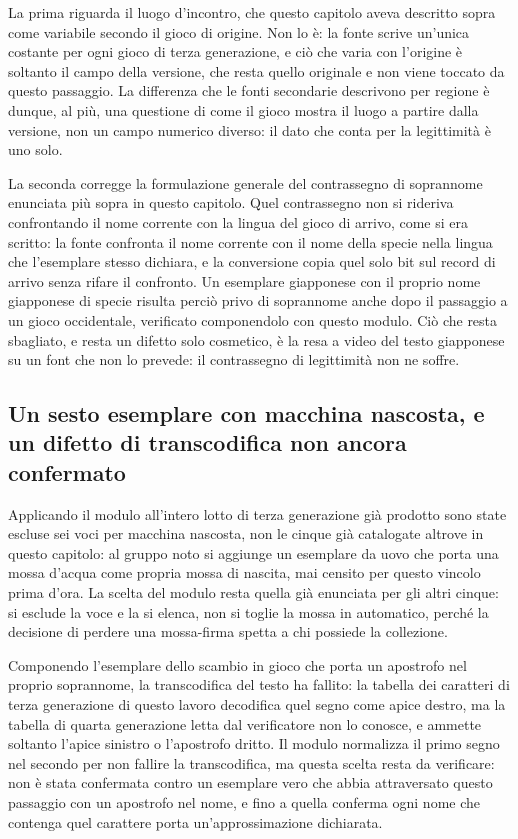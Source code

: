 La prima riguarda il luogo d'incontro, che questo capitolo aveva descritto sopra come variabile secondo il gioco di origine. Non lo è: la fonte scrive un'unica costante per ogni gioco di terza generazione, e ciò che varia con l'origine è soltanto il campo della versione, che resta quello originale e non viene toccato da questo passaggio. La differenza che le fonti secondarie descrivono per regione è dunque, al più, una questione di come il gioco mostra il luogo a partire dalla versione, non un campo numerico diverso: il dato che conta per la legittimità è uno solo.

La seconda corregge la formulazione generale del contrassegno di soprannome enunciata più sopra in questo capitolo. Quel contrassegno non si rideriva confrontando il nome corrente con la lingua del gioco di arrivo, come si era scritto: la fonte confronta il nome corrente con il nome della specie nella lingua che l'esemplare stesso dichiara, e la conversione copia quel solo bit sul record di arrivo senza rifare il confronto. Un esemplare giapponese con il proprio nome giapponese di specie risulta perciò privo di soprannome anche dopo il passaggio a un gioco occidentale, verificato componendolo con questo modulo. Ciò che resta sbagliato, e resta un difetto solo cosmetico, è la resa a video del testo giapponese su un font che non lo prevede: il contrassegno di legittimità non ne soffre.

\subsection{Un sesto esemplare con macchina nascosta, e un difetto di transcodifica non ancora confermato}

Applicando il modulo all'intero lotto di terza generazione già prodotto sono state escluse sei voci per macchina nascosta, non le cinque già catalogate altrove in questo capitolo: al gruppo noto si aggiunge un esemplare da uovo che porta una mossa d'acqua come propria mossa di nascita, mai censito per questo vincolo prima d'ora. La scelta del modulo resta quella già enunciata per gli altri cinque: si esclude la voce e la si elenca, non si toglie la mossa in automatico, perché la decisione di perdere una mossa-firma spetta a chi possiede la collezione.

Componendo l'esemplare dello scambio in gioco che porta un apostrofo nel proprio soprannome, la transcodifica del testo ha fallito: la tabella dei caratteri di terza generazione di questo lavoro decodifica quel segno come apice destro, ma la tabella di quarta generazione letta dal verificatore non lo conosce, e ammette soltanto l'apice sinistro o l'apostrofo dritto. Il modulo normalizza il primo segno nel secondo per non fallire la transcodifica, ma questa scelta resta da verificare: non è stata confermata contro un esemplare vero che abbia attraversato questo passaggio con un apostrofo nel nome, e fino a quella conferma ogni nome che contenga quel carattere porta un'approssimazione dichiarata.

